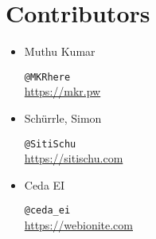 \chapter*{Contributors}
\begin{itemize}
  \item Muthu Kumar\\
    \begin{footnotesize}
      \texttt{@MKRhere}\\
      \url{https://mkr.pw}
    \end{footnotesize}

  \item Schürrle, Simon\\
    \begin{footnotesize}
      \texttt{@SitiSchu}\\
      \url{https://sitischu.com}
    \end{footnotesize}

  \item Ceda EI\\
    \begin{footnotesize}
      \texttt{@ceda\_ei}\\
      \url{https://webionite.com}
    \end{footnotesize}
\end{itemize}

